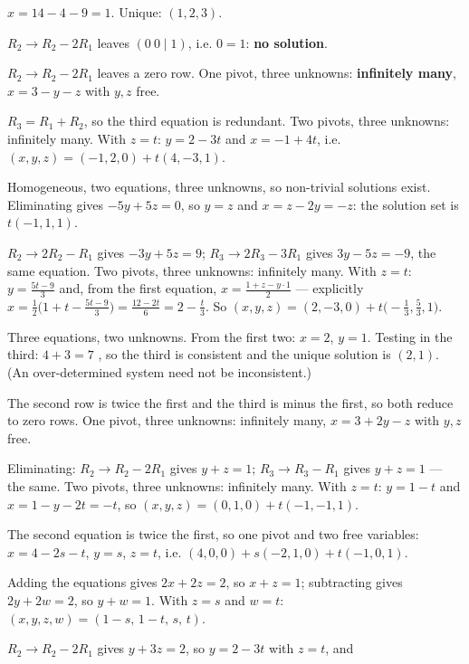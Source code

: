 \begin{solutions}
        $x=14-4-9=1$. Unique: $(1,2,3)$.
  \item $R_{2}\to R_{2}-2R_{1}$ leaves $(0\ 0\mid1)$, i.e. $0=1$:
        \textbf{no solution}.
  \item $R_{2}\to R_{2}-2R_{1}$ leaves a zero row. One pivot, three
        unknowns: \textbf{infinitely many}, $x=3-y-z$ with $y,z$ free.
  \item $R_{3}=R_{1}+R_{2}$, so the third equation is redundant. Two
        pivots, three unknowns: infinitely many. With $z=t$:
        $y=2-3t$ and $x=-1+4t$, i.e.
        $(x,y,z)=(-1,2,0)+t(4,-3,1)$.
  \item Homogeneous, two equations, three unknowns, so non-trivial
        solutions exist. Eliminating gives $-5y+5z=0$, so $y=z$ and
        $x=z-2y=-z$: the solution set is $t(-1,1,1)$.
  \item $R_{2}\to 2R_{2}-R_{1}$ gives $-3y+5z=9$;
        $R_{3}\to 2R_{3}-3R_{1}$ gives $3y-5z=-9$, the same equation.
        Two pivots, three unknowns: infinitely many. With $z=t$:
        $y=\tfrac{5t-9}{3}$ and, from the first equation,
        $x=\tfrac{1+z-y\cdot 1}{2}$ --- explicitly
        $x=\tfrac{1}{2}\bigl(1+t-\tfrac{5t-9}{3}\bigr)
        =\tfrac{12-2t}{6}=2-\tfrac{t}{3}$. So
        $(x,y,z)=(2,-3,0)+t\bigl(-\tfrac13,\tfrac53,1\bigr)$.
  \item Three equations, two unknowns. From the first two: $x=2$, $y=1$.
        Testing in the third: $4+3=7$ \checkmark, so the third is
        consistent and the unique solution is $(2,1)$. (An
        over-determined system need not be inconsistent.)
  \item The second row is twice the first and the third is minus the first,
        so both reduce to zero rows. One pivot, three unknowns: infinitely
        many, $x=3+2y-z$ with $y,z$ free.
  \item Eliminating: $R_{2}\to R_{2}-2R_{1}$ gives $y+z=1$;
        $R_{3}\to R_{3}-R_{1}$ gives $y+z=1$ --- the same. Two pivots,
        three unknowns: infinitely many. With $z=t$: $y=1-t$ and
        $x=1-y-2t=-t$, so $(x,y,z)=(0,1,0)+t(-1,-1,1)$.
  \item The second equation is twice the first, so one pivot and two free
        variables: $x=4-2s-t$, $y=s$, $z=t$, i.e.
        $(4,0,0)+s(-2,1,0)+t(-1,0,1)$.
  \item Adding the equations gives $2x+2z=2$, so $x+z=1$; subtracting gives
        $2y+2w=2$, so $y+w=1$. With $z=s$ and $w=t$:
        $(x,y,z,w)=(1-s,\,1-t,\,s,\,t)$.
  \item $R_{2}\to R_{2}-2R_{1}$ gives $y+3z=2$, so $y=2-3t$ with $z=t$, and

\end{solutions}
